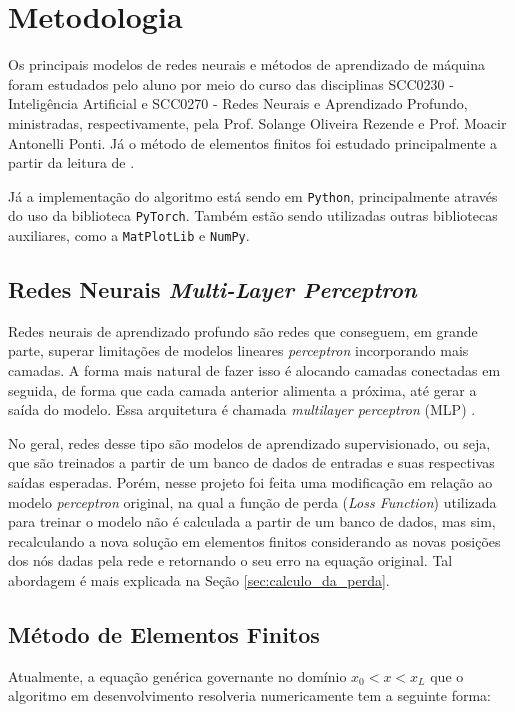 \section{Metodologia}

Os principais modelos de redes neurais e métodos de aprendizado de máquina foram estudados pelo aluno por meio do curso das disciplinas SCC0230 - Inteligência Artificial e SCC0270 - Redes Neurais e Aprendizado Profundo, ministradas, respectivamente, pela Prof. Solange Oliveira Rezende e Prof. Moacir Antonelli Ponti.
Já o método de elementos finitos foi estudado principalmente a partir da leitura de . 

Já a implementação do algoritmo está sendo em \texttt{Python}, principalmente através do uso da biblioteca \texttt{PyTorch}. Também estão sendo utilizadas outras bibliotecas auxiliares, como a \texttt{MatPlotLib} e \texttt{NumPy}.

\subsection{Redes Neurais \textit{Multi-Layer Perceptron}}

Redes neurais de aprendizado profundo são redes que conseguem, em grande parte, superar limitações de modelos lineares \textit{perceptron} incorporando mais camadas. 
A forma mais natural de fazer isso é alocando camadas conectadas em seguida, de forma que cada camada anterior alimenta a próxima, até gerar a saída do modelo. 
Essa arquitetura é chamada \textit{multilayer perceptron} (MLP) \cite{Zhang2021-od}.

No geral, redes desse tipo são modelos de aprendizado supervisionado, ou seja, que são treinados a partir de um banco de dados de entradas e suas respectivas saídas esperadas. 
Porém, nesse projeto foi feita uma modificação em relação ao modelo \textit{perceptron} original, na qual a função de perda (\textit{Loss Function}) utilizada para treinar o modelo não é calculada a partir de um banco de dados, mas sim, recalculando a nova solução em elementos finitos considerando as novas posições dos nós dadas pela rede e retornando o seu erro na equação original. 
Tal abordagem é mais explicada na Seção \ref{sec:calculo_da_perda}.

\subsection{Método de Elementos Finitos}

Atualmente, a equação genérica governante no domínio $ x_0 < x < x_L $ que o algoritmo em desenvolvimento resolveria numericamente tem a seguinte forma:

